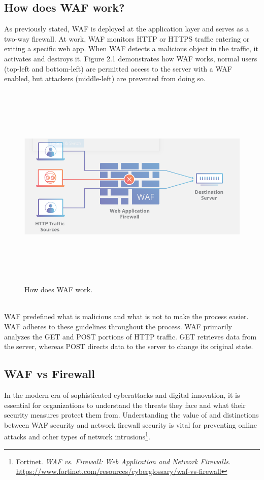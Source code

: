 \subsection{How does WAF work?}
\label{subsec:waf_work}
As previously stated, WAF is deployed at the application layer and serves as a two-way firewall. At work, WAF monitors HTTP or HTTPS traffic entering or exiting a specific web app. When WAF detects a malicious object in the traffic, it activates and destroys it. Figure 2.1 demonstrates how WAF works, normal users (top-left and bottom-left) are permitted access to the server with a WAF enabled, but attackers (middle-left) are prevented from doing so.
\begin{figure}[!h]
   
	\centering
	\includegraphics[width=\linewidth, height=10cm,keepaspectratio]{figures/WAF.JPG}
	\caption{How does WAF work.}\label{Fig:Data1}
  
\end{figure}
\\
WAF predefined what is malicious and what is not to make the process easier. WAF adheres to these guidelines throughout the process. WAF primarily analyzes the GET and POST portions of HTTP traffic. GET retrieves data from the server, whereas POST directs data to the server to change its original state.

\subsection{WAF vs Firewall}
\label{subsec:versus}
In the modern era of sophisticated cyberattacks and digital innovation, it is essential for organizations to understand the threats they face and what their security measures protect them from. Understanding the value of and distinctions between WAF security and network firewall security is vital for preventing online attacks and other types of network intrusions\footnote{Fortinet. \textit{WAF vs. Firewall: Web Application and Network Firewalls}. 
\url{https://www.fortinet.com/resources/cyberglossary/waf-vs-firewall}}.

